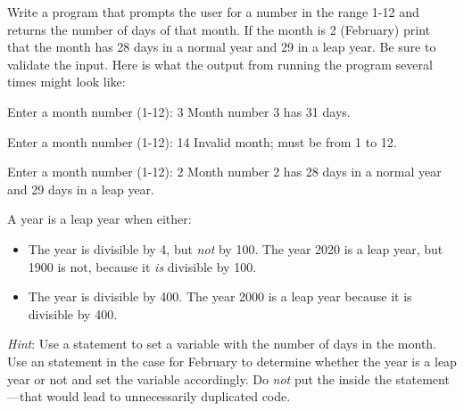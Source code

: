 \begin{exercise}
Write a program that prompts the user for a number in the range 1-12 and returns the number of days of that month. If the month is 2 (February) print that the month has 28 days in a normal year and 29 in a leap year. Be sure to validate the input.  Here is what the output from running the program several times might look like:

\begin{stdout}
Enter a month number (1-12): 3
Month number 3 has 31 days.

Enter a month number (1-12): 14
Invalid month; must be from 1 to 12.

Enter a month number (1-12): 2
Month number 2 has 28 days in a normal year
and 29 days in a leap year.
\end{stdout}

A year is a leap year when either:

\begin{itemize}
\item The year is divisible by 4, but {\em not} by 100. The year 2020 is a leap
year, but 1900 is not, because it {\em is} divisible by 100.
\item The year is divisible by 400.  The year 2000 is a leap year because it is
divisible by 400.
\end{itemize}

{\em Hint}: Use a  statement to set a variable with the number of days in the month. Use an  statement in the case for February to determine whether the year is a leap year or not and set the variable accordingly. Do {\em not} put the  inside the  statement---that would lead to unnecessarily duplicated code.

\end{exercise}

